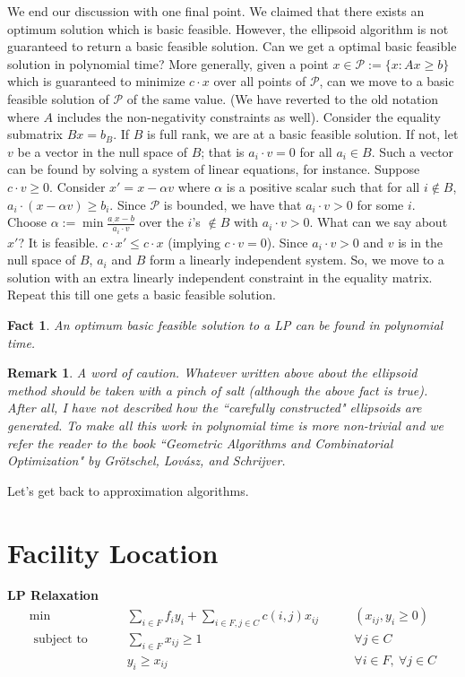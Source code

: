 \documentclass[11pt]{article}
\newtheorem{fact}{Fact}
\newtheorem{remark}{Remark}
\begin{document}
\def\P{{\mathcal P}}
\noindent
We end our discussion with one final point. We claimed that there exists an optimum solution which is basic feasible. However, the ellipsoid algorithm is not guaranteed to return a basic feasible solution. Can we get a  optimal basic feasible solution in polynomial time? More generally, given a point $x \in \P := \{x: Ax\ge b\}$ 
which is guaranteed to minimize $c\cdot x$ over all points of $\P$, can we move to a basic feasible solution of $\P$ of the same value. (We have reverted to the old notation where $A$ includes the non-negativity constraints as well). %
Consider the equality submatrix $Bx = b_B$. If $B$ is full rank, we are at a basic feasible solution. 
If not, let $v$ be a vector in the null space of $B$; that is $a_i\cdot v = 0$ for all $a_i\in B$. Such a vector can be found by solving a system of linear equations, for instance. Suppose $c\cdot v \ge 0$.
Consider $x' = x - \alpha v$ where $\alpha$ is a positive scalar such that for all $i\notin B$, $a_i\cdot(x - \alpha v) \ge b_i$. Since $\P$ is bounded, we have that $a_i\cdot v > 0$ for some $i$. Choose $\alpha := \min \frac{a_\cdot x - b}{a_i\cdot v}$ over the $i$'s $\notin B$ with $a_i\cdot v > 0$. What can we say about $x'$? It is feasible. 
$c\cdot x' \le c\cdot x$ (implying $c\cdot v = 0$). Since $a_i\cdot v > 0$ and $v$ is in the null space of $B$, $a_i$ and $B$ form a linearly independent system. So, we move to a solution with an extra linearly independent constraint in the equality matrix. Repeat this till one gets a basic feasible solution.

\begin{fact}
An optimum basic feasible solution to a LP can be found in polynomial time.
\end{fact}

\begin{remark}
A word of caution. Whatever written above about the ellipsoid method should be taken with a pinch of salt (although the above fact is true). After all, I have not described how the ``carefully constructed" ellipsoids are generated. To make all this work in polynomial time is more non-trivial and we refer the reader to the book ``Geometric Algorithms and Combinatorial Optimization" by Gr\"otschel, Lov\'asz, and Schrijver.
\end{remark}

\noindent
Let's get back to approximation algorithms.

\section{Facility Location}
\noindent
{\bf LP Relaxation}
\begin{align}
\min & \qquad \sum_{i\in F}f_iy_i + \sum_{i\in F,j\in C} c(i,j)x_{ij} & \qquad (x_{ij},y_i \ge 0) \\
\mbox{ subject to } & \qquad \sum_{i\in F} x_{ij} \ge 1 & \qquad \forall j\in C \label{eq:client} \\
			     & \qquad y_i \ge x_{ij} & \qquad \forall i\in F,~\forall j\in C \label{eq:fac-client}	 
\end{align}
\end{document}
